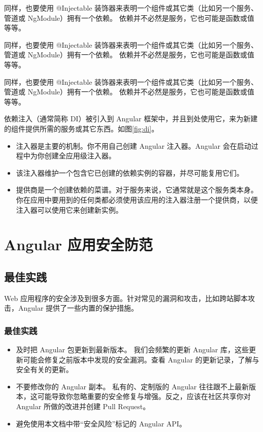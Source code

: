 \documentclass{progbookcn}
\begin{document}
同样，也要使用 @Injectable 装饰器来表明一个组件或其它类（比如另一个服务、管道或 NgModule）拥有一个依赖。 依赖并不必然是服务，它也可能是函数或值等等。

同样，也要使用 @Injectable 装饰器来表明一个组件或其它类（比如另一个服务、管道或 NgModule）拥有一个依赖。 依赖并不必然是服务，它也可能是函数或值等等。

同样，也要使用 @Injectable 装饰器来表明一个组件或其它类（比如另一个服务、管道或 NgModule）拥有一个依赖。 依赖并不必然是服务，它也可能是函数或值等等。

依赖注入（通常简称 DI）被引入到 Angular 框架中，并且到处使用它，来为新建的组件提供所需的服务或其它东西。如图\ref{fig:di}。

\begin{itemize}
  \item 注入器是主要的机制。你不用自己创建 Angular 注入器。Angular 会在启动过程中为你创建全应用级注入器。
  \item 该注入器维护一个包含它已创建的依赖实例的容器，并尽可能复用它们。
  \item 提供商是一个创建依赖的菜谱。对于服务来说，它通常就是这个服务类本身。你在应用中要用到的任何类都必须使用该应用的注入器注册一个提供商，以便注入器可以使用它来创建新实例。
\end{itemize}


\part{Angular 应用安全防范}


\chapter{最佳实践}

Web 应用程序的安全涉及到很多方面。针对常见的漏洞和攻击，比如跨站脚本攻击，Angular 提供了一些内置的保护措施。

\section{最佳实践}

\begin{itemize}
  \item 及时把 Angular 包更新到最新版本。 我们会频繁的更新 Angular 库，这些更新可能会修复之前版本中发现的安全漏洞。查看 Angular 的更新记录，了解与安全有关的更新。
  \item 不要修改你的 Angular 副本。 私有的、定制版的 Angular 往往跟不上最新版本，这可能导致你忽略重要的安全修复与增强。反之，应该在社区共享你对 Angular 所做的改进并创建 Pull Request。
  \item 避免使用本文档中带``安全风险''标记的 Angular API。
\end{itemize}
\end{document}

